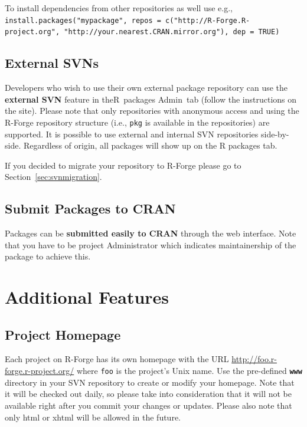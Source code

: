 \documentclass[a4paper]{article}
\let\code=\texttt
\newcommand{\proglang}[1]{\textsf{#1}}
\begin{document}
To install dependencies from other repositories as well use e.g.,
\code{install.packages("mypackage", repos = c("http://R-Forge.R-project.org",
"http://your.nearest.CRAN.mirror.org"), dep = TRUE)}

\subsection{External SVNs}
Developers who wish to use their own external package repository can
use the \textbf{external SVN} feature in the\proglang{R}~packages Admin~tab
(follow the instructions on the site). Please note that only
repositories with anonymous access and using the \proglang{R}-Forge repository
structure (i.e., \texttt{pkg} is available in the repositories) are
supported. It is possible to use 
external and internal SVN repositories side-by-side. Regardless of
origin, all packages will show up on the R packages tab.

If you decided to migrate your repository to \proglang{R}-Forge please go to
Section~\ref{sec:svnmigration}.

\subsection{Submit Packages to CRAN}
Packages can be \textbf{submitted easily to CRAN} through the web interface.
Note that you have to be project Administrator which indicates maintainership
of the package to achieve this. 


\section{Additional Features}

\subsection{Project Homepage}
Each project on \proglang{R}-Forge has its own homepage with the URL
\url{http://foo.r-forge.r-project.org/} where \texttt{foo} is the
project's Unix name. Use the
pre-defined \textbf{\texttt{www}} directory in your SVN repository to
create or modify your homepage. Note that it will be checked out
daily, so please take into consideration that it will not be available
right after you commit your changes or updates. Please also note that
only html or xhtml will be allowed in the future.
\end{document}
